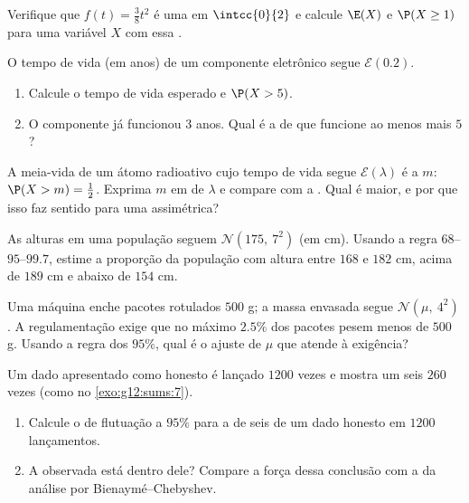 \begin{exercise}[$\star$]\label{exo:g12:contdist:2}
Verifique que $f(t) = \frac{3}{8}t^2$ é uma  em $\intcc{0}{2}$ e
calcule $\E(X)$ e $\P(X \geq 1)$ para uma variável $X$ com essa .
\end{exercise}

\begin{exercise}[$\star$]\label{exo:g12:contdist:3}
O tempo de vida (em anos) de um componente eletrônico segue
$\mathcal E(0.2)$.
\begin{enumerate}
  \item Calcule o tempo de vida esperado e $\P(X > 5)$.
  \item O componente já funcionou $3$ anos. Qual é a  de que
        funcione ao menos mais $5$?
\end{enumerate}
\end{exercise}

\begin{exercise}[$\star\star$]\label{exo:g12:contdist:4}
A meia-vida de um átomo radioativo cujo tempo de vida segue
$\mathcal E(\lambda)$ é a  $m$: $\P(X > m) = \frac12$. Exprima $m$
em  de $\lambda$ e compare com a . Qual é maior, e por que
isso faz sentido para uma  assimétrica?
\end{exercise}

\begin{exercise}[$\star\star$]\label{exo:g12:contdist:5}
As alturas em uma população seguem $\mathcal N(175,\ 7^2)$ (em cm). Usando
a regra $68$--$95$--$99.7$, estime a proporção da população com altura
entre $168$ e $182$ cm, acima de $189$ cm e abaixo de $154$ cm.
\end{exercise}

\begin{exercise}[$\star\star$]\label{exo:g12:contdist:6}
Uma máquina enche pacotes rotulados $500$ g; a massa envasada segue
$\mathcal N(\mu,\ 4^2)$. A regulamentação exige que no máximo $2.5\%$ dos
pacotes pesem menos de $500$ g. Usando a regra dos $95\%$, qual é o ajuste
 de $\mu$ que atende à exigência?
\end{exercise}

\begin{exercise}[$\star\star$]\label{exo:g12:contdist:7}
Um dado apresentado como honesto é lançado $1200$ vezes e mostra um seis
$260$ vezes (como no \cref{exo:g12:sums:7}).
\begin{enumerate}
  \item Calcule o  de flutuação a $95\%$ para a  de
        seis de um dado honesto em $1200$ lançamentos.
  \item A  observada está dentro dele? Compare a força dessa
        conclusão com a da análise por Bienaymé--Chebyshev.
\end{enumerate}
\end{exercise}

